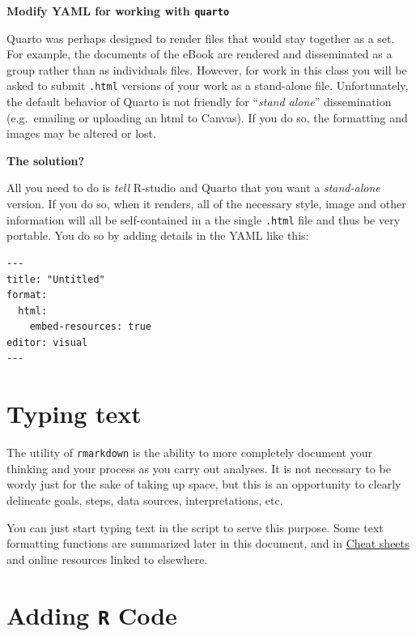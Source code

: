 \documentclass[
]{book}
\newenvironment{rmdtip}[1]
  {
  \begin{itemize}
  \renewcommand{\labelitemi}{
    \raisebox{-.7\height}[0pt][0pt]{
      {\setkeys{Gin}{width=3em,keepaspectratio}\texttt{[image: images/\#1]}}
    }
  }
  \setlength{\fboxsep}{1em}
  \begin{tip}
  \item
  }
  {
  \end{tip}
  \end{itemize}
  }
\begin{document}
\begin{rmdtip}{tip}

\textbf{Modify YAML for working with \texttt{quarto}}

Quarto was perhaps designed to render files that would stay together as a set. For example, the documents of the eBook are rendered and disseminated as a group rather than as individuals files. However, for work in this class you will be asked to submit \texttt{.html} versions of your work as a stand-alone file. Unfortunately, the default behavior of Quarto is not friendly for ``\emph{stand alone}'' dissemination (e.g.~emailing or uploading an html to Canvas). If you do so, the formatting and images may be altered or lost.

\textbf{The solution?}

All you need to do is \emph{tell} R-studio and Quarto that you want a \emph{stand-alone} version. If you do so, when it renders, all of the necessary style, image and other information will all be self-contained in a the single \texttt{.html} file and thus be very portable. You do so by adding details in the YAML like this:

\begin{verbatim}
---
title: "Untitled"
format:
  html:
    embed-resources: true
editor: visual
---
\end{verbatim}

\end{rmdtip}

\hypertarget{typing-text}{%
\section{Typing text}\label{typing-text}}

The utility of \texttt{rmarkdown} is the ability to more completely document your thinking and your process as you carry out analyses. It is not necessary to be wordy just for the sake of taking up space, but this is an opportunity to clearly delineate goals, steps, data sources, interpretations, etc.

You can just start typing text in the script to serve this purpose. Some text formatting functions are summarized later in this document, and in \href{https://github.com/rstudio/cheatsheets/raw/master/rmarkdown.pdf}{Cheat sheets} and online resources linked to elsewhere.

\hypertarget{adding-r-code}{%
\section{\texorpdfstring{Adding \texttt{R} Code}{Adding R Code}}\label{adding-r-code}}
\end{document}
